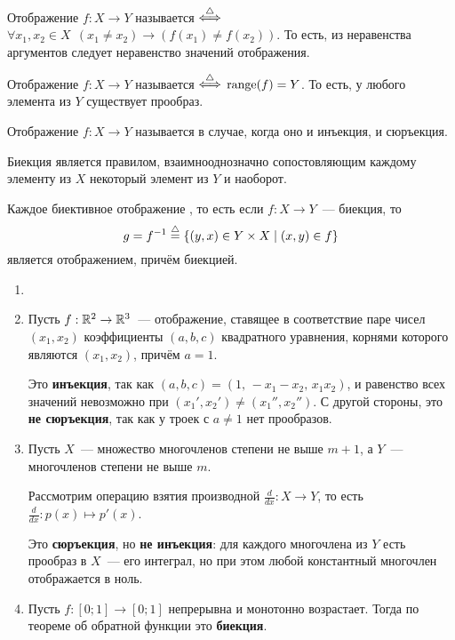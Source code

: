 \begin{definition}
    Отображение $ f: X \to Y $ называется  $ \overset{\triangle}{\Longleftrightarrow} $ $ \forall x_1, x_2 \in X \;\, (x_1 \neq x_2) \rightarrow (f(x_1) \neq f(x_2)) $.
    То есть, из неравенства аргументов следует неравенство значений отображения.
\end{definition}

\begin{definition}
    Отображение $ f: X \to Y $ называется  $ \overset{\triangle}{\Longleftrightarrow} $ $ \operatorname*{\textnormal{range}}(f) = Y $.
    То есть, у любого элемента из $ Y $ существует прообраз.
\end{definition}

\begin{definition}
    Отображение $ f: X \to Y $ называется  в случае, когда оно и инъекция, и сюръекция.
\end{definition}

\begin{remark}
    Биекция является правилом, взаимнооднозначно сопостовляющим каждому элементу из $ X $ некоторый элемент из $ Y $ и наоборот.
\end{remark}

\begin{corollary}
    Каждое биективное отображение , то есть если $ f: X \to Y $~--- биекция, то
    \[
        g = f^{-1} \overset{\triangle}{=} \{ (y, x) \in Y \times X \mid (x, y) \in f \}
    \]
    является отображением, причём биекцией.
\end{corollary}

\begin{example}
    \label{example:functions:mappings}
    \begin{enumerate}
        \item[]
        \item
            Пусть $ f: \mathbb{R}^2 \to \mathbb{R}^3 $~--- отображение, ставящее в соответствие паре чисел $ (x_1, x_2) $ коэффициенты $ (a, b, c) $
            квадратного уравнения, корнями которого являются $ (x_1, x_2) $, причём $ a = 1 $.

            Это \textbf{инъекция}, так как $ (a, b, c) = (1, \, - x_1 - x_2, \, x_1 x_2) $, и равенство всех значений невозможно при $ (x_1', x_2') \neq (x_1'', x_2'') $.
            С другой стороны, это \textbf{не сюръекция}, так как у троек с $ a \neq 1 $ нет прообразов.
        \item
            Пусть $ X $~--- множество многочленов степени не выше $ m+1 $, а $ Y $~--- многочленов степени не выше $ m $.

            Рассмотрим операцию взятия производной $ \frac{d}{dx}: X \to Y $, то есть $ \frac{d}{dx}: p(x) \mapsto p'(x) $.

            Это \textbf{сюръекция}, но \textbf{не инъекция}: для каждого многочлена из $ Y $ есть прообраз в $ X $~--- его интеграл, но при этом любой константный многочлен отображается в ноль.
        \item
            Пусть $ f: [0;1] \to [0;1] $ непрерывна и монотонно возрастает.
            Тогда по теореме об обратной функции это \textbf{биекция}.
    \end{enumerate}
\end{example}

